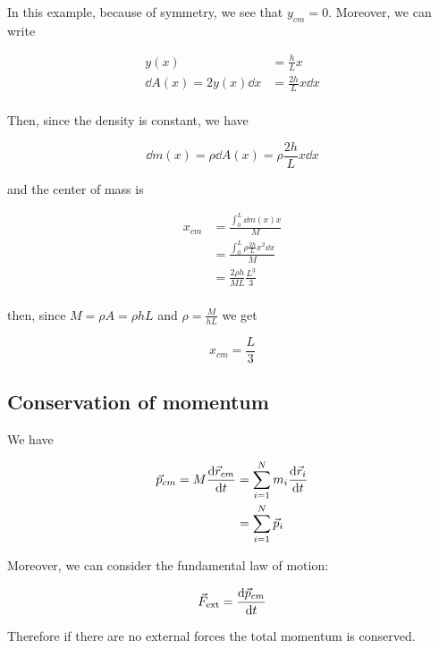 \documentclass[10pt]{extarticle}
\begin{document}
In this example, because of symmetry, we see that $y_{cm} = 0$.
Moreover, we can write

\begin{align*}
    y(x)                      & = \frac{h}{L} x         \\
    \dd{A}(x) = 2 y(x) \dd{x} & = \frac{2h}{L} x \dd{x} \\
\end{align*}

Then, since the density is constant, we have

$$
    \dd{m}(x) = \rho \dd{A}(x) = \rho \frac{2h}{L} x \dd{x}
$$

and the center of mass is

\begin{align*}
    x_{cm} & = \frac{\int_0^L \dd{m}(x) x}{M}                  \\
           & = \frac{\int_0^L \rho \frac{2h}{L} x^2 \dd{x}}{M} \\
           & = \frac{2 \rho h}{ML} \frac{L^3}{3}               \\
\end{align*}

then, since $M = \rho A = \rho h L$ and $\rho = \frac{M}{hL}$ we get

$$
    x_{cm} = \frac{L}{3}
$$

\subsection{Conservation of momentum}

We have

\begin{align*}
    \vec{p}_{cm} = M \dv{\vec{r}_{cm}}{t} & = \sum_{i = 1}^N m_i \dv{\vec{r}_i}{t} \\
                                          & = \sum_{i = 1}^N \vec{p}_i
\end{align*}

Moreover, we can consider the fundamental law of motion:

$$
    \vec{F}_{\text{ext}} = \dv{\vec{p}_{cm}}{t}
$$

Therefore if there are no external forces the total momentum is conserved.
\end{document}
